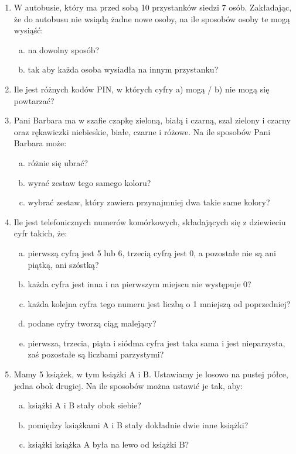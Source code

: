 \documentclass[12pt,a4paper]{article}
\begin{document}
\begin{enumerate}[1.]
\begin{enumerate}[a)]
	\end{enumerate}
\newpage
	\item W autobusie, który ma przed sobą 10 przystanków siedzi 7 osób. Zakładając, że do autobusu nie wsiądą żadne nowe osoby, na ile sposobów osoby te mogą wysiąść:
	\begin{enumerate}[a)]
		\item na dowolny sposób?
		\item tak aby każda osoba wysiadła na innym przystanku?
	\end{enumerate}
	\item Ile jest różnych kodów PIN, w których cyfry a) mogą / b) nie mogą się powtarzać?
	\item Pani Barbara ma w szafie czapkę zieloną, białą i czarną, szal zielony i czarny oraz rękawiczki niebieskie, białe, czarne i różowe. Na ile sposobów Pani Barbara może:
	\begin{enumerate}[a)]
		\item różnie się ubrać?
		\item wyrać zestaw tego samego koloru?
		\item wybrać zestaw, który zawiera przynajmniej dwa takie same kolory?
	\end{enumerate}
	\item Ile jest telefonicznych numerów komórkowych, składających się z dziewieciu cyfr takich, że:
	\begin{enumerate}[a)]
		\item pierwszą cyfrą jest 5 lub 6, trzecią cyfrą jest 0, a pozostałe nie są ani piątką, ani szóstką?
		\item każda cyfra jest inna i na pierwszym miejscu nie występuje 0?
		\item każda kolejna cyfra tego numeru jest liczbą o 1 mniejszą od poprzedniej?
		\item podane cyfry tworzą ciąg malejący?
		\item pierwsza, trzecia, piąta i siódma cyfra jest taka sama i jest nieparzysta, zaś pozostałe są liczbami parzystymi?
	\end{enumerate}
	\item Mamy 5 książek, w tym książki A i B. Ustawiamy je losowo na pustej półce, jedna obok drugiej. Na ile sposobów można ustawić je tak, aby:
	\begin{enumerate}[a)]
		\item książki A i B stały obok siebie?
		\item pomiędzy książkami A i B stały dokładnie dwie inne książki?
		\item książki książka A była na lewo od książki B?

\end{enumerate}
\end{enumerate}
\end{document}

